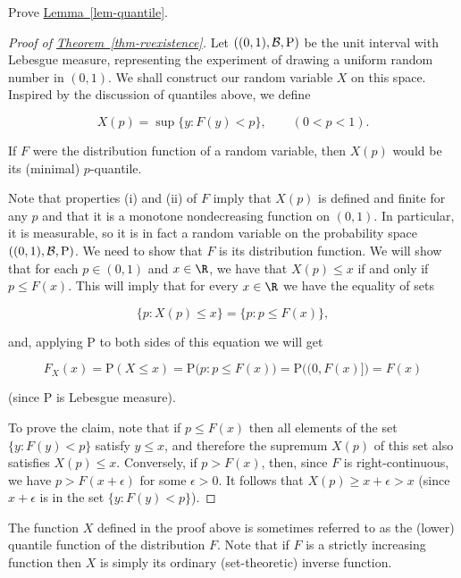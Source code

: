 \begin{xexercise}
Prove \hyperref[lem-quantile]{Lemma~\ref*{lem-quantile}}.
\end{xexercise}

\begin{proof}[Proof of \texorpdfstring{\hyperref[thm-rvexistence]{Theorem~\ref*{thm-rvexistence}}}{Theorem}]
Let $((0,1), {\cal B}, \mathrm{P})$ be the unit
interval with Lebesgue measure, representing the
experiment of drawing a uniform random number in
$(0,1)$. We shall construct our random variable $X$
on this space. Inspired by the discussion of quantiles
above, we define

\[
X(p) = \sup\{ y : F(y) < p \}, \qquad (0<p<1).
\]

\noindent If $F$ were the distribution function of a random
variable, then $X(p)$ would be its (minimal)
$p$-quantile.

Note that properties (i) and (ii) of $F$ imply that
$X(p)$ is defined and finite for any $p$ and that it
is a monotone nondecreasing function on $(0,1)$. In
particular, it is measurable, so it is in fact a
random variable on the probability space
$((0,1), {\cal B}, \mathrm{P})$. We need to show that
$F$ is its distribution function. We will show that
for each $p\in (0,1)$ and $x\in \R$, we have that
$X(p) \le x$ if and only if $p \le F(x)$. This will
imply that for every $x\in \R$ we have the equality
of sets

\[
\{ p : X(p) \le x \} = \{ p : p \le F(x) \},
\]

\noindent and, applying $\mathrm{P}$ to both sides of this
equation we will get

\[
F_X(x) = \mathrm{P}(X\le x) = \mathrm{P}\big( p : p \le F(x) \big) = \mathrm{P}\big( (0,F(x)] \big)
= F(x)
\]

\noindent (since $\mathrm{P}$ is Lebesgue measure).

To prove the claim, note that if $p \le F(x)$ then
all elements of the set $\{ y : F(y) < p\}$ satisfy
$y\le x$, and therefore the supremum $X(p)$ of this
set also satisfies $X(p) \le x$. Conversely, if
$p > F(x)$, then, since $F$ is right-continuous, we
have $p > F(x+\epsilon)$ for some $\epsilon>0$. It
follows that $X(p)\ge x+\epsilon>x$ (since
$x+\epsilon$ is in the set $\{ y : F(y)<p \}$).
\end{proof}

\noindent The function $X$ defined in the proof above is
sometimes referred to as the (lower) quantile function
of the distribution $F$. Note that if $F$ is a
strictly increasing function then $X$ is simply its
ordinary (set-theoretic) inverse function.
